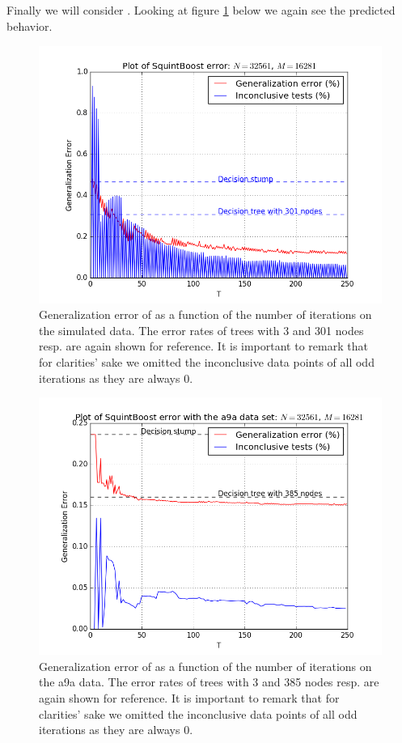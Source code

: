 \subsection{\squintB}
\label{subsec:sqPracPerf}
Finally we will consider \squintB. Looking at figure \ref{fig:SQGD} below we again see the predicted behavior. 
\begin{figure}[!ht]
  \centering
      \includegraphics[width=\graphWidth]{generated/SQGD.png}
  \caption{Generalization error of \squintB as a function of the number of iterations on the simulated data. The error rates of trees with 3 and 301 nodes resp. are again shown for reference. It is important to remark that for clarities' sake we omitted the inconclusive data points of all odd iterations as they are always 0.}
      \label{fig:SQGD}
\end{figure}
\begin{figure}[!ht]
  \centering
      \includegraphics[width=\graphWidth]{generated/SQSVM.png}
  \caption{Generalization error of \squintB as a function of the number of iterations on the a9a data. The error rates of trees with 3 and 385 nodes resp. are again shown for reference. It is important to remark that for clarities' sake we omitted the inconclusive data points of all odd iterations as they are always 0.}
      \label{fig:SQSVM}
\end{figure}
\FloatBarrier

